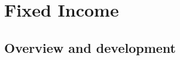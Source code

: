 \documentclass[compress]{beamer}
\begin{document}
%
%
%
%
%
%

\section{Fixed Income}
\subsection{Overview and development}
\end{document}
